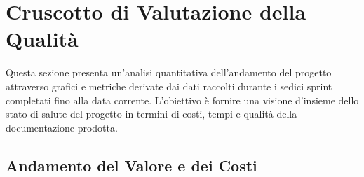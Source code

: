 \documentclass[a4paper,11pt,oneside]{scrartcl}
\begin{document}
\newpage
\section{Cruscotto di Valutazione della Qualità}

Questa sezione presenta un'analisi quantitativa dell'andamento del progetto attraverso grafici e metriche derivate dai dati raccolti durante i sedici sprint completati fino alla data corrente. L'obiettivo è fornire una visione d'insieme dello stato di salute del progetto in termini di costi, tempi e qualità della documentazione prodotta.

\subsection{Andamento del Valore e dei Costi}
\end{document}
